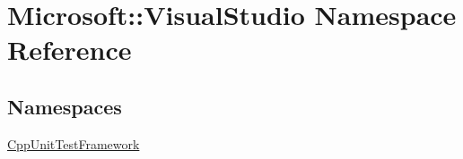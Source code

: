 \hypertarget{namespace_microsoft_1_1_visual_studio}{}\section{Microsoft\+:\+:Visual\+Studio Namespace Reference}
\label{namespace_microsoft_1_1_visual_studio}
\subsection*{Namespaces}
\begin{DoxyCompactItemize}
\item 
 \hyperlink{namespace_microsoft_1_1_visual_studio_1_1_cpp_unit_test_framework}{Cpp\+Unit\+Test\+Framework}
\end{DoxyCompactItemize}
